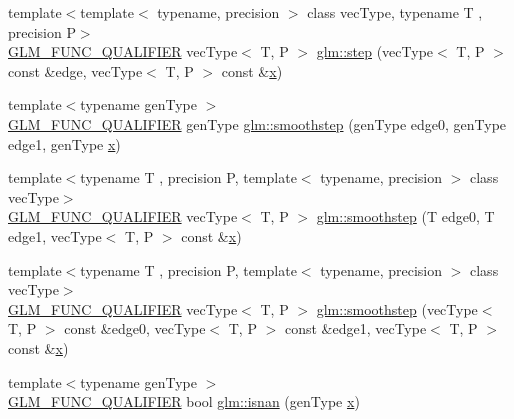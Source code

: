 \begin{DoxyCompactItemize}
\item 
{\footnotesize template$<$template$<$ typename, precision $>$ class vec\+Type, typename T , precision P$>$ }\\\mbox{\hyperlink{setup_8hpp_a33fdea6f91c5f834105f7415e2a64407}{G\+L\+M\+\_\+\+F\+U\+N\+C\+\_\+\+Q\+U\+A\+L\+I\+F\+I\+ER}} vec\+Type$<$ T, P $>$ \mbox{\hyperlink{group__core__func__common_ga6d84170051fb87c183c38883ec85b411}{glm\+::step}} (vec\+Type$<$ T, P $>$ const \&edge, vec\+Type$<$ T, P $>$ const \&\mbox{\hyperlink{glad_8h_a92d0386e5c19fb81ea88c9f99644ab1d}{x}})
\item 
{\footnotesize template$<$typename gen\+Type $>$ }\\\mbox{\hyperlink{setup_8hpp_a33fdea6f91c5f834105f7415e2a64407}{G\+L\+M\+\_\+\+F\+U\+N\+C\+\_\+\+Q\+U\+A\+L\+I\+F\+I\+ER}} gen\+Type \mbox{\hyperlink{group__core__func__common_ga562edf7eca082cc5b7a0aaf180436daf}{glm\+::smoothstep}} (gen\+Type edge0, gen\+Type edge1, gen\+Type \mbox{\hyperlink{glad_8h_a92d0386e5c19fb81ea88c9f99644ab1d}{x}})
\item 
{\footnotesize template$<$typename T , precision P, template$<$ typename, precision $>$ class vec\+Type$>$ }\\\mbox{\hyperlink{setup_8hpp_a33fdea6f91c5f834105f7415e2a64407}{G\+L\+M\+\_\+\+F\+U\+N\+C\+\_\+\+Q\+U\+A\+L\+I\+F\+I\+ER}} vec\+Type$<$ T, P $>$ \mbox{\hyperlink{group__core__func__common_gaeb3d9cf6e832b6d0000cd76e04cef682}{glm\+::smoothstep}} (T edge0, T edge1, vec\+Type$<$ T, P $>$ const \&\mbox{\hyperlink{glad_8h_a92d0386e5c19fb81ea88c9f99644ab1d}{x}})
\item 
{\footnotesize template$<$typename T , precision P, template$<$ typename, precision $>$ class vec\+Type$>$ }\\\mbox{\hyperlink{setup_8hpp_a33fdea6f91c5f834105f7415e2a64407}{G\+L\+M\+\_\+\+F\+U\+N\+C\+\_\+\+Q\+U\+A\+L\+I\+F\+I\+ER}} vec\+Type$<$ T, P $>$ \mbox{\hyperlink{group__core__func__common_ga8b9b9ba3425d603118cf90aee8b32bd6}{glm\+::smoothstep}} (vec\+Type$<$ T, P $>$ const \&edge0, vec\+Type$<$ T, P $>$ const \&edge1, vec\+Type$<$ T, P $>$ const \&\mbox{\hyperlink{glad_8h_a92d0386e5c19fb81ea88c9f99644ab1d}{x}})
\item 
{\footnotesize template$<$typename gen\+Type $>$ }\\\mbox{\hyperlink{setup_8hpp_a33fdea6f91c5f834105f7415e2a64407}{G\+L\+M\+\_\+\+F\+U\+N\+C\+\_\+\+Q\+U\+A\+L\+I\+F\+I\+ER}} bool \mbox{\hyperlink{namespaceglm_afd4cba966f582de51d0957ed0abdb244}{glm\+::isnan}} (gen\+Type \mbox{\hyperlink{glad_8h_a92d0386e5c19fb81ea88c9f99644ab1d}{x}})

\end{DoxyCompactItemize}
